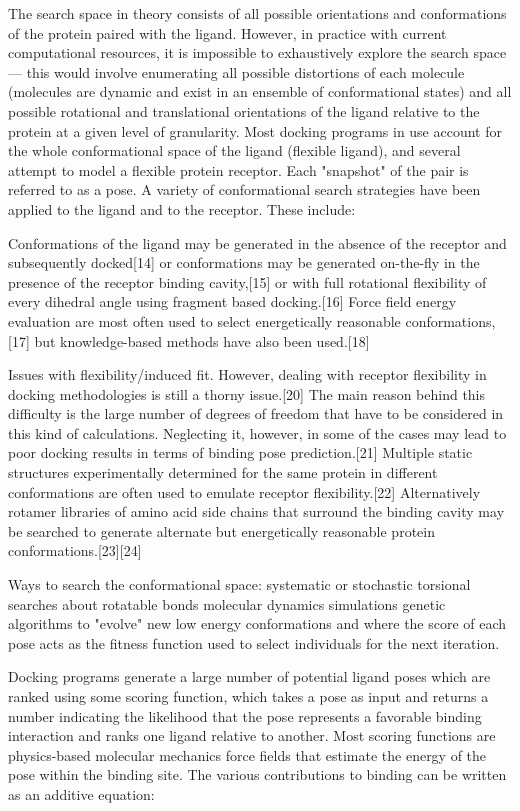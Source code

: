 The search space in theory consists of all possible orientations and conformations of the protein paired with the ligand. However, in practice with current computational resources, it is impossible to exhaustively explore the search space — this would involve enumerating all possible distortions of each molecule (molecules are dynamic and exist in an ensemble of conformational states) and all possible rotational and translational orientations of the ligand relative to the protein at a given level of granularity. Most docking programs in use account for the whole conformational space of the ligand (flexible ligand), and several attempt to model a flexible protein receptor. Each "snapshot" of the pair is referred to as a pose. A variety of conformational search strategies have been applied to the ligand and to the receptor. These include:

Conformations of the ligand may be generated in the absence of the receptor and subsequently docked[14] or conformations may be generated on-the-fly in the presence of the receptor binding cavity,[15] or with full rotational flexibility of every dihedral angle using fragment based docking.[16] Force field energy evaluation are most often used to select energetically reasonable conformations,[17] but knowledge-based methods have also been used.[18]

Issues with flexibility/induced fit. However, dealing with receptor flexibility in docking methodologies is still a thorny issue.[20] The main reason behind this difficulty is the large number of degrees of freedom that have to be considered in this kind of calculations. Neglecting it, however, in some of the cases may lead to poor docking results in terms of binding pose prediction.[21] Multiple static structures experimentally determined for the same protein in different conformations are often used to emulate receptor flexibility.[22] Alternatively rotamer libraries of amino acid side chains that surround the binding cavity may be searched to generate alternate but energetically reasonable protein conformations.[23][24]

Ways to search the conformational space:
systematic or stochastic torsional searches about rotatable bonds
molecular dynamics simulations
genetic algorithms to "evolve" new low energy conformations and where the score of each pose acts as the fitness function used to select individuals for the next iteration.

Docking programs generate a large number of potential ligand poses which are ranked using some scoring function, which takes a pose as input and returns a number indicating the likelihood that the pose represents a favorable binding interaction and ranks one ligand relative to another. Most scoring functions are physics-based molecular mechanics force fields that estimate the energy of the pose within the binding site. The various contributions to binding can be written as an additive equation:

